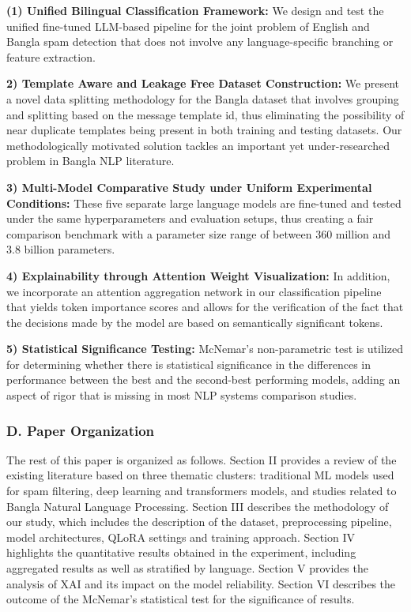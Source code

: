 \textbf{(1) Unified Bilingual Classification Framework:} We design and
test the unified fine-tuned LLM-based pipeline for the joint problem of
English and Bangla spam detection that does not involve any
language-specific branching or feature extraction.

\textbf{2) Template Aware and Leakage Free Dataset Construction:} We
present a novel data splitting methodology for the Bangla dataset that
involves grouping and splitting based on the message template id, thus
eliminating the possibility of near duplicate templates being present in
both training and testing datasets. Our methodologically motivated
solution tackles an important yet under-researched problem in Bangla NLP
literature.

\textbf{3) Multi-Model Comparative Study under Uniform Experimental
Conditions:} These five separate large language models are fine-tuned
and tested under the same hyperparameters and evaluation setups, thus
creating a fair comparison benchmark with a parameter size range of
between 360 million and 3.8 billion parameters.

\textbf{4) Explainability through Attention Weight Visualization:} In
addition, we incorporate an attention aggregation network in our
classification pipeline that yields token importance scores and allows
for the verification of the fact that the decisions made by the model
are based on semantically significant tokens.

\textbf{5) Statistical Significance Testing:} McNemar's non-parametric
test is utilized for determining whether there is statistical
significance in the differences in performance between the best and the
second-best performing models, adding an aspect of rigor that is missing
in most NLP systems comparison studies.

\subsubsection{D. Paper Organization}\label{d.-paper-organization}

The rest of this paper is organized as follows. Section II provides a
review of the existing literature based on three thematic clusters:
traditional ML models used for spam filtering, deep learning and
transformers models, and studies related to Bangla Natural Language
Processing. Section III describes the methodology of our study, which
includes the description of the dataset, preprocessing pipeline, model
architectures, QLoRA settings and training approach. Section IV
highlights the quantitative results obtained in the experiment,
including aggregated results as well as stratified by language. Section
V provides the analysis of XAI and its impact on the model reliability.
Section VI describes the outcome of the McNemar's statistical test for
the significance of results.

